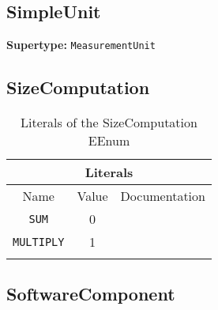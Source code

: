 \documentclass{article}
\begin{document}
\subsection[SimpleUnit]{SimpleUnit}
\label{e4smSimpleUnit}

\textbf{Supertype: }\texttt{MeasurementUnit}
\subsection[SizeComputation]{SizeComputation}
\label{e4smSizeComputation}

\begin{table}[H]
\footnotesize
\begin{tabularx}{\textwidth}{| c | c | X |}
\hline
\multicolumn{3}{|c|}{\textbf{Literals}} \\
\hline
Name & Value & Documentation \\ \hline \hline
\texttt{SUM} & 0 &
 \\ \hline
\texttt{MULTIPLY} & 1 &
 \\ \hline
\caption{Literals of the SizeComputation EEnum}
\end{tabularx}
\label{e4smSizeComputationlit}
\end{table}
\subsection[SoftwareComponent]{SoftwareComponent}
\label{e4smSoftwareComponent}
\end{document}
